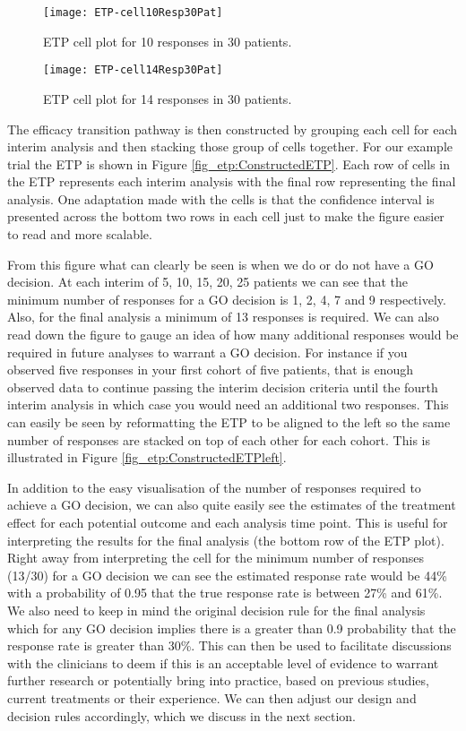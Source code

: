 \begin{figure}[h!]
	\centering
	\caption{ETP cell plot for 10 responses in 30 patients.}
	\label{fig_etp:Cell10Resp30Pat}
	\texttt{[image: ETP-cell10Resp30Pat]}
\end{figure}


\begin{figure}[h!]
	\centering
	\caption{ETP cell plot for 14 responses in 30 patients.}
	\label{fig_etp:Cell14Resp30Pat}
	\texttt{[image: ETP-cell14Resp30Pat]}
\end{figure}


The efficacy transition pathway is then constructed by grouping each cell for each interim analysis and then stacking those group of cells together. For our example trial the ETP is shown in Figure \ref{fig_etp:ConstructedETP}. Each row of cells in the ETP represents each interim analysis with the final row representing the final analysis. One adaptation made with the cells is that the confidence interval is presented across the bottom two rows in each cell just to make the figure easier to read and more scalable. 

From this figure what can clearly be seen is when we do or do not have a GO decision. At each interim of 5, 10, 15, 20, 25 patients we can see that the minimum number of responses for a GO decision is 1, 2, 4, 7 and 9 respectively. Also, for the final analysis a minimum of 13 responses is required. We can also read down the figure to gauge an idea of how many additional responses would be required in future analyses to warrant a GO decision. For instance if you observed five responses in your first cohort of five patients, that is enough observed data to continue passing the interim decision criteria until the fourth interim analysis in which case you would need an additional two responses. This can easily be seen by reformatting the ETP to be aligned to the left so the same number of responses are stacked on top of each other for each cohort. This is illustrated in Figure \ref{fig_etp:ConstructedETPleft}. 

In addition to the easy visualisation of the number of responses required to achieve a GO decision, we can also quite easily see the estimates of the treatment effect for each potential outcome and each analysis time point. This is useful for interpreting the results for the final analysis (the bottom row of the ETP plot). Right away from interpreting the cell for the minimum number of responses (13/30) for a GO decision we can see the estimated response rate would be 44\% with a probability of 0.95 that the true response rate is between 27\% and 61\%. We also need to keep in mind the original decision rule for the final analysis which for any GO decision implies there is a greater than 0.9 probability that the response rate is greater than 30\%. This can then be used to facilitate discussions with the clinicians to deem if this is an acceptable level of evidence to warrant further research or potentially bring into practice, based on previous studies, current treatments or their experience. We can then adjust our design and decision rules accordingly, which we discuss in the next section. 

